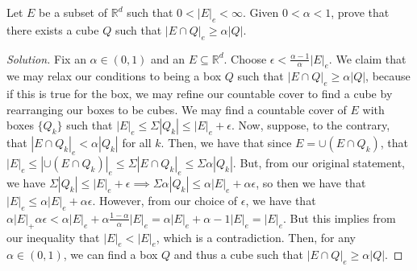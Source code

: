 \documentclass[10pt]{article}
\newenvironment{problem}[2][Problem]{\begin{trivlist}
\item[\hskip \labelsep {\bfseries #1}\hskip \labelsep {\bfseries #2.}]}{\end{trivlist}}
\begin{document}
\begin{problem}{2.2.39}
Let $E$ be a subset of $\mathbb{R}^d$ such that $0 < |E|_e < \infty$. Given $0 < \alpha < 1$, prove that there exists a cube $Q$ such that $|E \cap Q|_e \geq \alpha |Q|$.
\end{problem}
\begin{proof}[Solution]

Fix an $\alpha \in (0,1)$ and an $E \subseteq \mathbb{R}^d$. Choose $\epsilon < \frac{\alpha - 1}{\alpha} |E|_e$. We claim that we may relax our conditions to being a box $Q$ such that $|E \cap Q|_e \geq \alpha |Q|$, because if this is true for the box, we may refine our countable cover to find a cube by rearranging our boxes to be cubes. We may find a countable cover of $E$ with boxes $\{ Q_k \}$ such that $|E|_e \leq \Sigma |Q_k| \leq |E|_e + \epsilon$. Now, suppose, to the contrary, that $|E \cap Q_k|_e < \alpha |Q_k|$ for all $k$. Then, we have that since $E = \cup (E \cap Q_k)$, that $|E|_e \leq |\cup (E \cap Q_k)|_e \leq  \Sigma |E \cap Q_k|_e \leq \Sigma \alpha |Q_k|$. But, from our original statement, we have $\Sigma |Q_k| \leq |E|_e + \epsilon \implies \Sigma \alpha |Q_k| \leq \alpha |E|_e + \alpha \epsilon$, so then we have that $|E|_e \leq  \alpha |E|_e + \alpha \epsilon$. However, from our choice of $\epsilon$, we have that $\alpha |E|_ + \alpha \epsilon < \alpha |E|_e + \alpha  \frac{1 - \alpha}{\alpha} |E|_e =  \alpha |E|_e + \alpha - 1 |E|_e = |E|_e$. But this implies from our inequality that $|E|_e < |E|_e$, which is a contradiction. Then, for any $\alpha \in (0,1)$, we can find a box $Q$ and thus a cube such that $|E \cap Q|_e \geq \alpha |Q|$.

\end{proof}
\end{document}

